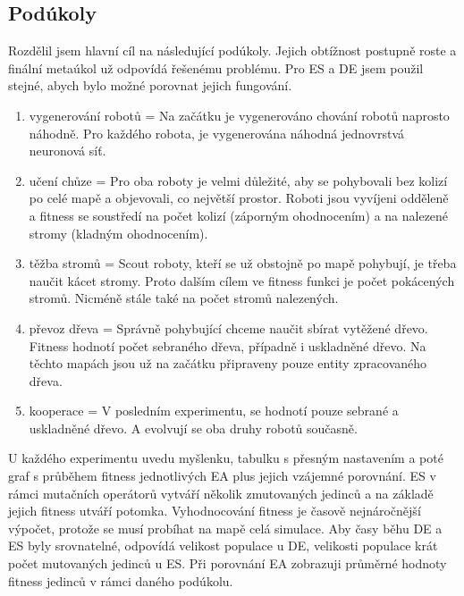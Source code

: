 \subsection{Podúkoly} 
Rozdělil jsem hlavní cíl na následující podúkoly. Jejich obtížnost postupně roste a finální metaúkol už odpovídá řešenému problému. Pro ES a DE jsem použil stejné, abych bylo možné porovnat jejich fungování. 
\begin{enumerate}
        \item vygenerování robotů = Na začátku je vygenerováno chování robotů naprosto náhodně. Pro každého robota, je vygenerována náhodná jednovrstvá neuronová síť. 
        \item učení chůze = Pro oba roboty je velmi důležité, aby se pohybovali bez kolizí po celé mapě a objevovali, co největší prostor. Roboti jsou vyvíjeni odděleně a fitness se soustředí na počet kolizí (záporným ohodnocením) a na nalezené stromy (kladným ohodnocením).
        \item těžba stromů = Scout roboty, kteří se už obstojně po mapě pohybují, je třeba naučit kácet stromy. Proto dalším  cílem ve fitness funkci je počet pokácených stromů. Nicméně stále také na počet stromů nalezených. 
        \item převoz dřeva = Správně pohybující chceme naučit sbírat vytěžené dřevo. Fitness hodnotí počet sebraného dřeva, případně i uskladněné dřevo. Na těchto mapách jsou už na začátku připraveny pouze entity zpracovaného dřeva.
        \item kooperace = V posledním experimentu, se hodnotí pouze sebrané a uskladněné dřevo. A evolvují se oba druhy robotů současně. 
\end{enumerate}
U každého experimentu uvedu myšlenku, tabulku s přesným nastavením a poté graf s průběhem fitness jednotlivých EA plus jejich vzájemné porovnání. ES v rámci mutačních operátorů vytváří několik zmutovaných jedinců a na základě jejich fitness utváří potomka. Vyhodnocování fitness je časově nejnáročnější výpočet, protože se musí probíhat na mapě celá simulace. Aby časy běhu DE a ES byly srovnatelné, odpovídá velikost populace u DE, velikosti populace krát počet mutovaných jedinců u ES. Při porovnání EA zobrazuji průměrné hodnoty fitness jedinců v rámci daného podúkolu. 
\newpage

